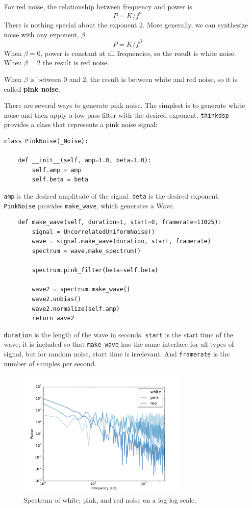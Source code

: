 \documentclass[12pt]{book}
\begin{document}
For red noise, the relationship between frequency
and power is
%
\[ P = K / f^{2} \]
%
There is nothing special about the exponent 2.  More generally,
we can synthesize noise with any exponent, $\beta$.
%
\[ P = K / f^{\beta} \]
%
When $\beta = 0$, power is constant at all frequencies,
so the result is white noise.  When $\beta=2$ the result is red noise.

When $\beta$ is between 0 and 2, the result is between white and
red noise, so it is called {\bf pink noise}.

There are several ways to generate pink noise.  The simplest is to
generate white noise and then apply a low-pass filter with the
desired exponent.  {\tt thinkdsp} provides a class that represents
a pink noise signal:

\begin{verbatim}
class PinkNoise(_Noise):

    def __init__(self, amp=1.0, beta=1.0):
        self.amp = amp
        self.beta = beta
\end{verbatim}

{\tt amp} is the desired amplitude of the signal.
{\tt beta} is the desired exponent.  {\tt PinkNoise} provides
\verb"make_wave", which generates a Wave.

\begin{verbatim}
    def make_wave(self, duration=1, start=0, framerate=11025):
        signal = UncorrelatedUniformNoise()
        wave = signal.make_wave(duration, start, framerate)
        spectrum = wave.make_spectrum()

        spectrum.pink_filter(beta=self.beta)

        wave2 = spectrum.make_wave()
        wave2.unbias()
        wave2.normalize(self.amp)
        return wave2
\end{verbatim}

{\tt duration} is the length of the wave in seconds.  {\tt start} is
the start time of the wave; it is included so that \verb"make_wave"
has the same interface for all types of signal, but for random noise,
start time is irrelevant.  And {\tt framerate} is the number of
samples per second.

\begin{figure}
\centerline{\includegraphics[height=2.5in]{figs/noise-triple.pdf}}
\caption{Spectrum of white, pink, and red noise on a log-log scale.}
\label{fig.noise-triple}
\end{figure}
\end{document}
